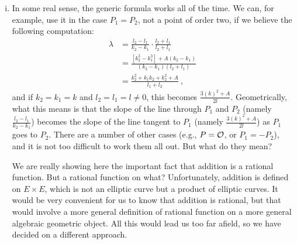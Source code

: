 \rems
\begin{enumerate}[(i)]
\item
In some real sense, the generic formula works all of the time. We can, for example, use it in the case $P_{1}=P_{2}$, not a point of order two, if we believe the following computation:
\begin{equation}
\label{eq1.6}
\begin{split}
\lambda&=\frac{l_{2}-l_{1}}{k_{2}-k_{1}}\cdot\frac{l_{2}+l_{1}}{l_{2}+l_{1}}\\
&=\displaystyle \frac{[k_{2}^{3}-k_{1}^{3}]+A(k_{2}-k_{1})}{(k_{2}-k_{1})(l_{2}+l_{1})}\\
&=\frac{k_{2}^{2}+k_{1}k_{2}+k_{2}^{2}+A}{l_{1}+l_{2}}\ ,
\end{split}
\end{equation}
and if $k_{2}=k_{1}=k$ and $l_{2}=l_{1}=l \neq 0$, this becomes $\frac{3(k)^{2}+A}{2l}$. Geometrically, what this means is that the slope of the line through $P_{1}$ and $P_{2}$ (namely $\frac{l_{2}-l_{1}}{k_{2}-k_{1}}$) becomes the slope of the line tangent to $P_{1}$ (namely
$\frac{3(k)^{2}+A}{2l}$) as $P_{1}$ goes to $P_{2}$. There are a number of other cases (e.g., $P=\mathcal{O}$, or $P_{1}=-P_{2}$), and it is not too difficult to work them all out. But what do they mean?

We are really showing here the important fact that addition is a rational function. But a rational function on what? Unfortunately, addition is defined on $E \times E$, which is not an elliptic curve but a product of elliptic curves. It would be very convenient for us to know that addition is rational, but that would involve a more general definition of rational function on a more general algebraic geometric object. All this would lead us too
far afield, so we have decided on a different approach.


\end{enumerate}
